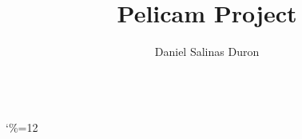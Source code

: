 \documentclass{tufte-book}
\title{Pelicam Project}
\author{Daniel Salinas Duron}
\begin{document}
\maketitle 

\frontmatter

 \\
{\catcode`\%=12 }
\end{document}
